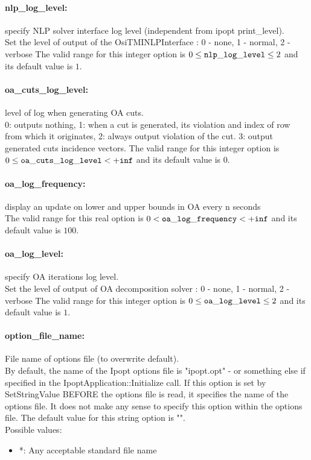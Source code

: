 \paragraph{nlp\_log\_level:}\label{opt:nlp_log_level} specify NLP solver interface log level (independent from ipopt print\_level). \\
 Set the level of output of the OsiTMINLPInterface : 0 - none, 1 - normal, 2 - verbose The valid range for this integer option is
$0 \le {\tt nlp\_log\_level } \le 2$
and its default value is $1$.


\paragraph{oa\_cuts\_log\_level:}\label{opt:oa_cuts_log_level} level of log when generating OA cuts. \\
 0: outputs nothing,
1: when a cut is generated, its violation and index of row from which it originates,
2: always output violation of the cut.
3: output generated cuts incidence vectors. The valid range for this integer option is
$0 \le {\tt oa\_cuts\_log\_level } <  {\tt +inf}$
and its default value is $0$.


\paragraph{oa\_log\_frequency:}\label{opt:oa_log_frequency} display an update on lower and upper bounds in OA every n seconds \\
 The valid range for this real option is 
$0 <  {\tt oa\_log\_frequency } <  {\tt +inf}$
and its default value is $100$.


\paragraph{oa\_log\_level:}\label{opt:oa_log_level} specify OA iterations log level. \\
 Set the level of output of OA decomposition solver : 0 - none, 1 - normal, 2 - verbose The valid range for this integer option is
$0 \le {\tt oa\_log\_level } \le 2$
and its default value is $1$.


\paragraph{option\_file\_name:}\label{opt:option_file_name} File name of options file (to overwrite default). \\
 By default, the name of the Ipopt options file is "ipopt.opt" - or something else if specified in the IpoptApplication::Initialize call. If this option is set by SetStringValue BEFORE the options file is read, it specifies the name of the options file.  It does not make any sense to specify this option within the options file. The default value for this string option is "".
\\ 
Possible values:
\begin{itemize}
   \item *: Any acceptable standard file name
\end{itemize}

